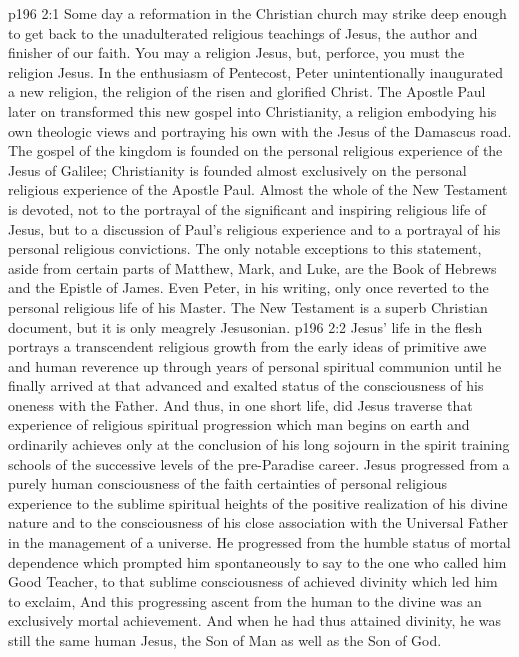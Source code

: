 \vs p196 2:1 Some day a reformation in the Christian church may strike deep enough to get back to the unadulterated religious teachings of Jesus, the author and finisher of our faith. You may  a religion  Jesus, but, perforce, you must  the religion  Jesus. In the enthusiasm of Pentecost, Peter unintentionally inaugurated a new religion, the religion of the risen and glorified Christ. The Apostle Paul later on transformed this new gospel into Christianity, a religion embodying his own theologic views and portraying his own  with the Jesus of the Damascus road. The gospel of the kingdom is founded on the personal religious experience of the Jesus of Galilee; Christianity is founded almost exclusively on the personal religious experience of the Apostle Paul. Almost the whole of the New Testament is devoted, not to the portrayal of the significant and inspiring religious life of Jesus, but to a discussion of Paul’s religious experience and to a portrayal of his personal religious convictions. The only notable exceptions to this statement, aside from certain parts of Matthew, Mark, and Luke, are the Book of Hebrews and the Epistle of James. Even Peter, in his writing, only once reverted to the personal religious life of his Master. The New Testament is a superb Christian document, but it is only meagrely Jesusonian.
\vs p196 2:2 Jesus’ life in the flesh portrays a transcendent religious growth from the early ideas of primitive awe and human reverence up through years of personal spiritual communion until he finally arrived at that advanced and exalted status of the consciousness of his oneness with the Father. And thus, in one short life, did Jesus traverse that experience of religious spiritual progression which man begins on earth and ordinarily achieves only at the conclusion of his long sojourn in the spirit training schools of the successive levels of the pre\hyp{}Paradise career. Jesus progressed from a purely human consciousness of the faith certainties of personal religious experience to the sublime spiritual heights of the positive realization of his divine nature and to the consciousness of his close association with the Universal Father in the management of a universe. He progressed from the humble status of mortal dependence which prompted him spontaneously to say to the one who called him Good Teacher,  to that sublime consciousness of achieved divinity which led him to exclaim,  And this progressing ascent from the human to the divine was an exclusively mortal achievement. And when he had thus attained divinity, he was still the same human Jesus, the Son of Man as well as the Son of God.
